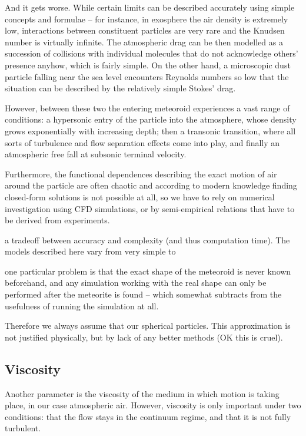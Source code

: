         And it gets worse. While certain limits can be described accurately using
        simple concepts and formulae -- for instance, in exosphere the air density is extremely low,
        interactions between constituent particles are very rare and the Knudsen number is virtually infinite.
        The atmospheric drag can be then modelled as a succession of collisions with individual
        molecules that do not acknowledge others' presence anyhow, which is fairly simple.
        On the other hand, a microscopic dust particle falling near the sea level encounters
        Reynolds numbers so low that the situation can be described by the relatively simple Stokes' drag.

        However, between these two the entering meteoroid experiences a vast range of conditions:
        a hypersonic entry of the particle into the atmosphere, whose density grows exponentially with increasing depth;
        then a transonic transition, where all sorts of turbulence and flow separation effects come into play,
        and finally an atmospheric free fall at subsonic terminal velocity.

        Furthermore, the functional dependences describing the exact motion
        of air around the particle are often chaotic and according to modern knowledge
        finding closed-form solutions is not possible at all, so we have to rely
        on numerical investigation using CFD simulations, or by semi-empirical
        relations that have to be derived from experiments.


        a tradeoff between accuracy and complexity (and thus computation time).
        The models described here vary from very simple to 

        one particular problem is that the exact shape of the meteoroid is never known beforehand,
        and any simulation working with the real shape can only be performed after the meteorite is
        found -- which somewhat subtracts from the usefulness of running the simulation at all.

        Therefore we always assume that our spherical particles.
        This approximation is not justified physically, but by lack of any better methods (OK this is cruel).

    \subsection{Viscosity} \label{fdv}
        Another parameter is the viscosity of the medium in which
        motion is taking place, in our case atmospheric air.
        However, viscosity is only important under two conditions: that the flow stays
        in the continuum regime, and that it is not fully turbulent.

